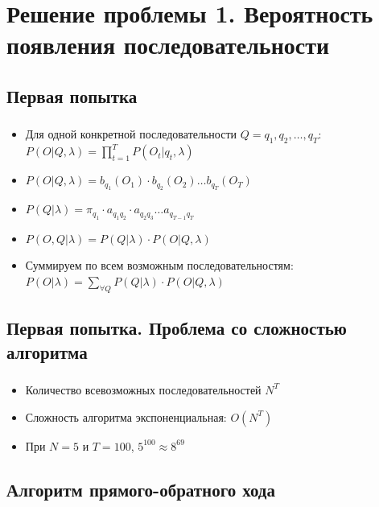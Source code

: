 \documentclass{beamer}
\begin{document}
\section{Решение проблемы 1. Вероятность появления последовательности}
\subsection{Первая попытка}

\begin{frame}
  \frametitle{\insertsection}
  \framesubtitle{\insertsubsection}
  \begin{itemize}
  \item Для одной конкретной последовательности $Q = q_1, q_2, \ldots, q_T$: \\ $\displaystyle P(O | Q, \lambda) = \prod_{t = 1}^{T} P(O_t | q_t, \lambda)$
    \pause
  \item $\displaystyle P(O | Q, \lambda) = b_{q_1}(O_1) \cdot b_{q_2}(O_2) \ldots b_{q_T}(O_T)$ \pause
  \item $\displaystyle P(Q | \lambda) = \pi_{q_1} \cdot a_{q_1q_2} \cdot a_{q_2q_3} \ldots a_{q_{T - 1}q_T}$ \pause
  \item $\displaystyle P(O, Q | \lambda) = P(Q | \lambda) \cdot P(O | Q, \lambda)$
    \pause
  \item Суммируем по всем возможным последовательностям: $\displaystyle P(O | \lambda) = \sum_{\forall Q} P(Q | \lambda) \cdot P(O | Q, \lambda)$
  \end{itemize}
\end{frame}

\subsection{Первая попытка. Проблема со сложностью алгоритма}

\begin{frame}
  \frametitle{\insertsection}
  \framesubtitle{\insertsubsection}
  \begin{itemize}
  \item Количество всевозможных последовательностей $N^T$ \pause
  \item Сложность алгоритма экспоненциальная: $O(N^T)$
  \item При $N = 5$ и  $T = 100$, $5^{100} \approx 8^{69}$
  \end{itemize}
\end{frame}

\subsection{Алгоритм прямого-обратного хода}
\end{document}
